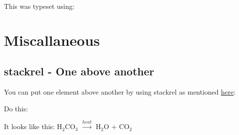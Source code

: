 \documentclass[a4paper,extrafontsizes,12pt,twoside,openany]{memoir}
\newcommand{\showpart}[1]{\noindent}
\begin{document}
This was typeset using: \showpart{FONTTRANSPARENCY}

\chapter{Miscallaneous}

\section{stackrel - One above another}

You can put one element above another by using stackrel as mentioned
\href{http://www.uz.ac.zw/science/maths/latex/stackrel.html}{here}:

Do this: \showpart{STACKREL}

It looks like this:
H$_2$CO$_3$ $\stackrel{heat}{\longrightarrow}$ H$_2$O + CO$_2$
\end{document}
